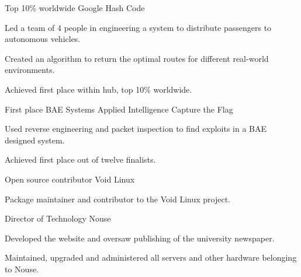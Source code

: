 
\begin{cventries}
  \cventry
    {Top 10\% worldwide} %
    {Google Hash Code} %
    {} %
    {} %
    {
      \begin{cvitems} %
        \item {Led a team of 4 people in engineering a system to distribute passengers to autonomous vehicles.}
        \vspace{0.5mm}
        \item {Created an algorithm to return the optimal routes for different real-world environments.}
        \vspace{0.5mm}
        \item {Achieved first place within hub, top 10\% worldwide.}
      \end{cvitems}
    }
    
  \cventry
    {First place} %
    {BAE Systems Applied Intelligence Capture the Flag} %
    {} %
    {} %
    {
      \begin{cvitems} %
        \item {Used reverse engineering and packet inspection to find exploits in a BAE designed system.}
        \vspace{0.5mm}
        \item {Achieved first place out of twelve finalists.}
      \end{cvitems}
    }
    
  \cventry
    {Open source contributor} %
    {Void Linux} %
    {} %
    {} %
    {
      \begin{cvitems} %
        \item {Package maintainer and contributor to the Void Linux project.}
      \end{cvitems}
    }
    
  \cventry
    {Director of Technology} %
    {Nouse} %
    {} %
    {} %
    {
      \begin{cvitems} %
        \item {Developed the website and oversaw publishing of the university newspaper.}
        \vspace{0.5mm}
        \item {Maintained, upgraded and administered all servers and other hardware belonging to Nouse.}
      \end{cvitems}
    }
\end{cventries}
